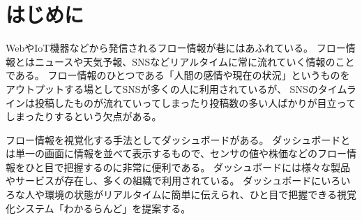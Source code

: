 \section{はじめに}

WebやIoT機器などから発信されるフロー情報が巷にはあふれている。
フロー情報とはニュースや天気予報、SNSなどリアルタイムに常に流れていく情報のことである。
フロー情報のひとつである「人間の感情や現在の状況」というものをアウトプットする場としてSNSが多くの人に利用されているが、
SNSのタイムラインは投稿したものが流れていってしまったり投稿数の多い人ばかりが目立ってしまったりするという欠点がある。

フロー情報を視覚化する手法としてダッシュボードがある。
ダッシュボードとは単一の画面に情報を並べて表示するもので、センサの値や株価などのフロー情報をひと目で把握するのに非常に便利である。
ダッシュボードには様々な製品やサービスが存在し、多くの組織で利用されている。
ダッシュボードにいろいろな人や環境の状態がリアルタイムに簡単に伝えられ、ひと目で把握できる視覚化システム「わかるらんど」を提案する。
